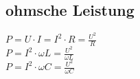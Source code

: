 \subsection{ohmsche Leistung}
\begin{multicols}{3}
	$P=U \cdot I = I^2 \cdot R = \frac{U^2}{R}$ \\
	$P= I^2 \cdot \omega L = \frac{U^2}{\omega L}$\\
	$P= I^2 \cdot \omega C = \frac{U^2}{\omega C}$
\end{multicols}